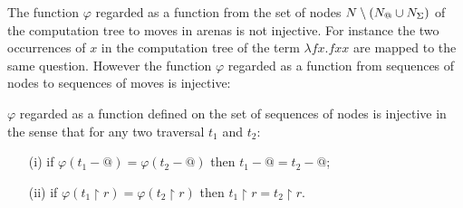The function $\varphi$ regarded as a function from the set of nodes $N\setminus (N_@ \cup N_\Sigma)$ of the computation tree to moves in arenas is not injective.
For instance the two occurrences of $x$ in the computation tree of the term $\lambda f x. f x x$ are mapped to the same question. However
the function $\varphi$ regarded as a function from sequences of nodes to sequences of moves is injective:
\begin{lem}
\label{lem:varphiinjective}
$\varphi$ regarded as a function defined on the set of
sequences of nodes is injective in the sense that for any two traversal $t_1$ and $t_2$:
\begin{itemize}
\item[(i)] if $\varphi (t_1 - @ ) = \varphi (t_2 - @ )$ then $t_1-@ =t_2 -@$;
\item[(ii)] if $\varphi (t_1 \upharpoonright r ) = \varphi (t_2 \upharpoonright r )$ then $t_1\upharpoonright r = t_2\upharpoonright r$.
\end{itemize}
\end{lem}
